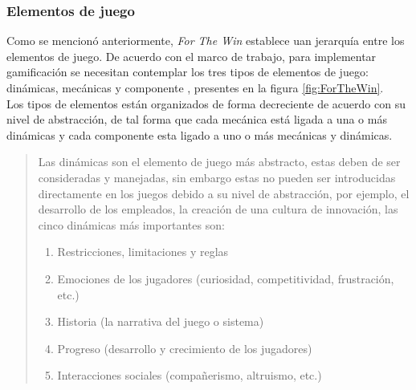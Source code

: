 \subsubsection{Elementos de juego}

 \noindent Como se mencionó anteriormente, {\em For The Win} establece uan jerarquía entre los
 elementos de juego. De acuerdo con el marco de trabajo, para implementar gamificación se
 necesitan contemplar los tres tipos de elementos de juego: dinámicas, mecánicas y componente
 \cite[pp. 55-57]{ForTheWin}, presentes en la figura \ref{fig:ForTheWin}.\\
 
 \noindent Los tipos de elementos están organizados de forma decreciente de acuerdo con su nivel
 de abstracción, de tal forma que cada mecánica está ligada a una o más dinámicas y cada componente
 esta ligado a uno o más mecánicas y dinámicas.\\


 \begin{quote}
    Las dinámicas son el elemento de juego más abstracto, estas deben de ser consideradas y 
    manejadas, sin embargo estas no pueden ser introducidas directamente en los juegos debido
    a su nivel de abstracción, por ejemplo, el desarrollo de los empleados, la creación de una
    cultura de innovación, las cinco dinámicas más importantes son:

    \begin{enumerate}
        \item Restricciones, limitaciones y reglas
        \item Emociones de los jugadores (curiosidad, competitividad, frustración, etc.)
        \item Historia (la narrativa del juego o sistema)
        \item Progreso (desarrollo y crecimiento de los jugadores)
        \item Interacciones sociales (compañerismo, altruismo, etc.)
    \end{enumerate}

 \end{quote}
 
 \clearpage

